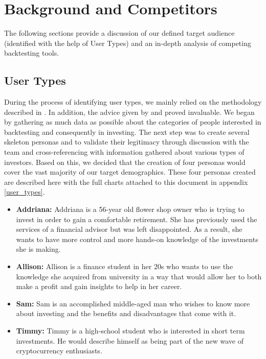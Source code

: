 \documentclass[main.tex]{subfiles}
\begin{document}
\section{Background and Competitors}

The following sections provide a discussion of our defined target audience (identified with the help of User Types) and an in-depth analysis of competing backtesting tools.

\subsection{User Types}

During the process of identifying user types, we mainly relied on the methodology described in \cite{pathy}. In addition, the advice given by \cite{uiux_fundation} and \cite{user_types_interaction_design_fundation} proved invaluable. We began by gathering as much data as possible about the categories of people interested in backtesting and consequently in investing. The next step was to create several skeleton personas \cite{personas} and to validate their legitimacy through discussion with the team and cross-referencing with information gathered about various types of investors. Based on this, we decided that the creation of four personas would cover the vast majority of our target demographics.
These four personas created are described here with the full charts attached to this document in appendix \ref{user_types}.
\begin{itemize}
\item \textbf{Addriana: }Addriana is a 56-year old flower shop owner who is trying to invest in order to gain a comfortable retirement. She has previously used the services of a financial advisor but was left disappointed. As a result, she wants to have more control and more hands-on knowledge of the investments she is making.
\item \textbf{Allison: }Allison is a finance student in her 20s who wants to use the knowledge she acquired from university in a way that would allow her to both make a profit and gain insights to help in her career.
\item\textbf{Sam: }Sam is an accomplished middle-aged man who wishes to know more about investing and the benefits and disadvantages that come with it. 
\item\textbf{Timmy: }Timmy is a high-school student who is interested in short term investments. He would describe himself as being part of the new wave of cryptocurrency enthusiasts.
\end{itemize}
\end{document}
